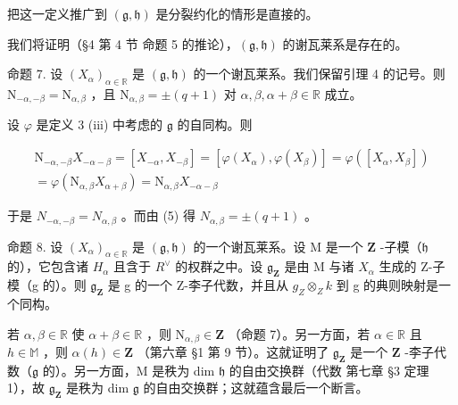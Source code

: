把这一定义推广到 \((\mathfrak{g},\mathfrak{h})\) 是分裂约化的情形是直接的。

我们将证明（§4 第 4 节 命题 5 的推论），\((\mathfrak{g},\mathfrak{h})\) 的谢瓦莱系是存在的。

命题 7. 设 \((X_{\alpha})_{\alpha \in \mathbb{R}}\) 是 \((\mathfrak{g},\mathfrak{h})\) 的一个谢瓦莱系。我们保留引理 4 的记号。则 \(\mathrm{N}_{-\alpha, - \beta} = \mathrm{N}_{\alpha ,\beta}\) ，且 \(\mathrm{N}_{\alpha ,\beta} = \pm (q + 1)\) 对 \(\alpha ,\beta ,\alpha +\beta \in \mathbb{R}\) 成立。

设 \(\varphi\) 是定义 3 (iii) 中考虑的 \(\mathfrak{g}\) 的自同构。则

\[
\begin{array}{r} \mathrm{N} _ {- \alpha , - \beta} X _ {- \alpha - \beta} = [ X _ {- \alpha}, X _ {- \beta} ] = [ \varphi (X _ {\alpha}), \varphi (X _ {\beta}) ] = \varphi ([ X _ {\alpha}, X _ {\beta} ]) \\ = \varphi (\mathrm{N} _ {\alpha , \beta} X _ {\alpha + \beta}) = \mathrm{N} _ {\alpha , \beta} X _ {- \alpha - \beta} \end{array}
\]

于是 \(N_{-\alpha,-\beta}=N_{\alpha,\beta}\) 。而由 (5) 得 \(N_{\alpha,\beta}=\pm(q+1)\) 。

命题 8. 设 \((X_{\alpha})_{\alpha \in \mathbb{R}}\) 是 \((\mathfrak{g},\mathfrak{h})\) 的一个谢瓦莱系。设 \(\mathrm{M}\) 是一个 \(\mathbf{Z}\) -子模（\(\mathfrak{h}\) 的），它包含诸 \(H_{\alpha}\) 且含于 \(R^{\vee}\) 的权群之中。设 \(\mathfrak{g}_{\mathbf{Z}}\) 是由 M 与诸 \(X_{\alpha}\) 生成的 Z-子模（g 的）。则 \(\mathfrak{g}_{\mathbf{Z}}\) 是 g 的一个 Z-李子代数，并且从 \(g_{Z} \otimes_{Z} k\) 到 g 的典则映射是一个同构。

若 \(\alpha, \beta \in \mathbb{R}\) 使 \(\alpha + \beta \in \mathbb{R}\) ，则 \(\mathrm{N}_{\alpha, \beta} \in \mathbf{Z}\) （命题 7）。另一方面，若 \(\alpha \in \mathbb{R}\) 且 \(h \in \mathbb{M}\) ，则 \(\alpha(h) \in \mathbf{Z}\) （第六章 §1 第 9 节）。这就证明了 \(\mathfrak{g}_{\mathbf{Z}}\) 是一个 \(\mathbf{Z}\) -李子代数（\(\mathfrak{g}\) 的）。另一方面，M 是秩为 dim \(\mathfrak{h}\) 的自由交换群（代数 第七章 §3 定理 1），故 \(\mathfrak{g}_{\mathbf{Z}}\) 是秩为 dim \(\mathfrak{g}\) 的自由交换群；这就蕴含最后一个断言。


